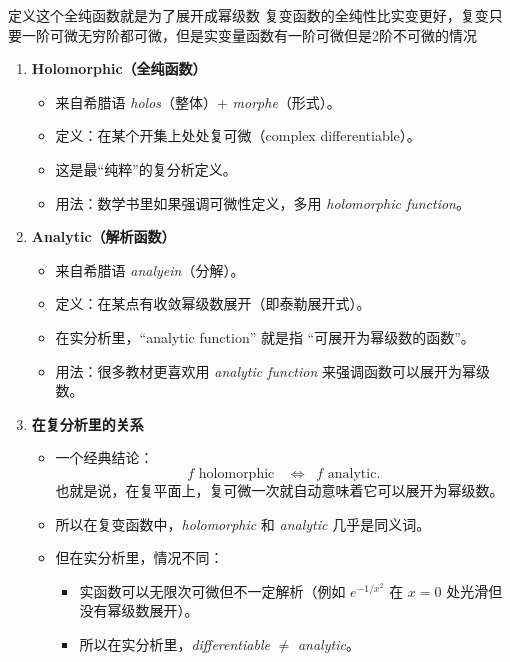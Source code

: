 \documentclass[lang=cn,10pt]{elegantbook}
\begin{document}
\begin{dxtips}
    定义这个全纯函数就是为了展开成幂级数
复变函数的全纯性比实变更好，复变只要一阶可微无穷阶都可微，但是实变量函数有一阶可微但是2阶不可微的情况
\end{dxtips}
\begin{proposition}
 	 

\begin{enumerate}
  \item \textbf{Holomorphic（全纯函数）}
  \begin{itemize}
    \item 来自希腊语 \emph{holos}（整体）+ \emph{morphe}（形式）。
    \item 定义：在某个开集上处处复可微（complex differentiable）。
    \item 这是最“纯粹”的复分析定义。
    \item 用法：数学书里如果强调可微性定义，多用 \emph{holomorphic function}。
  \end{itemize}

  \item \textbf{Analytic（解析函数）}
  \begin{itemize}
    \item 来自希腊语 \emph{analyein}（分解）。
    \item 定义：在某点有收敛幂级数展开（即泰勒展开式）。
    \item 在实分析里，``analytic function'' 就是指 ``可展开为幂级数的函数''。
    \item 用法：很多教材更喜欢用 \emph{analytic function} 来强调函数可以展开为幂级数。
  \end{itemize}

  \item \textbf{在复分析里的关系}
  \begin{itemize}
    \item 一个经典结论：
    \[
      f \text{ holomorphic } \;\;\Longleftrightarrow\;\; f \text{ analytic}.
    \]
    也就是说，在复平面上，复可微一次就自动意味着它可以展开为幂级数。
    \item 所以在复变函数中，\emph{holomorphic} 和 \emph{analytic} 几乎是同义词。
    \item 但在实分析里，情况不同：
    \begin{itemize}
      \item 实函数可以无限次可微但不一定解析（例如 $e^{-1/x^2}$ 在 $x=0$ 处光滑但没有幂级数展开）。
      \item 所以在实分析里，\emph{differentiable} $\neq$ \emph{analytic}。
    \end{itemize}
  \end{itemize}
\end{enumerate}
\end{proposition}
\end{document}
